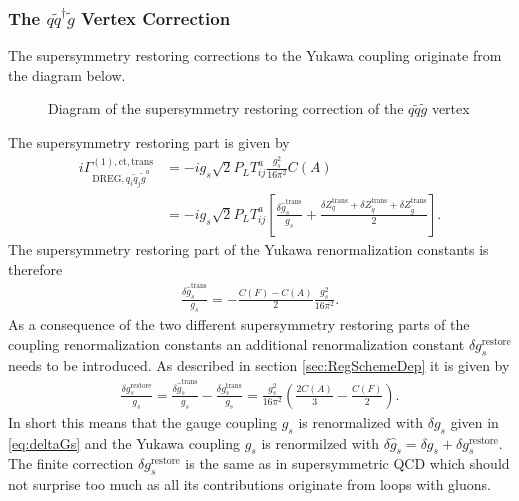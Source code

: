 \subsubsection*{The $q\tilde{q}^\dagger\tilde{g}$ Vertex Correction}
The supersymmetry restoring corrections to the Yukawa coupling originate from the diagram below.
\begin{figure}[!htbp]
\begin{center}
\caption{Diagram of the supersymmetry restoring correction of  the $q\tilde{q}\tilde{g}$ vertex}
\end{center}
\end{figure}
The supersymmetry restoring part is given by
\begin{align}
i\Gamma^{\mathrm{(1),ct,trans}}_{\mathrm{DREG}, q_i\tilde{q}_j\tilde{g}^a} &= -ig_s \sqrt{2} P_L T^a_{ij}  \frac{g_s^2}{16\pi^2}C(A)\\
&= -ig_s \sqrt{2} P_L T^a_{ij}  \left[ \frac{\delta \hat{g}_s^{\mathrm{trans}}}{g_s} + \frac{\delta Z^{\mathrm{trans}}_q + \delta Z^{\mathrm{trans}}_{\tilde{q}} + \delta Z^{\mathrm{trans}}_{\tilde{g}}}{2} \right].
\end{align}
The supersymmetry restoring part of the Yukawa renormalization constants is therefore
\begin{align}
\frac{\delta \hat{g}_s^{\mathrm{trans}}}{g_s} = -\frac{C(F)-C(A)}{2} \frac{g_s^2}{16\pi^2}.
\end{align}
As a consequence of the two different supersymmetry restoring parts of the coupling renormalization constants an additional renormalization constant $\delta g_s^{\mathrm{restore}}$ needs to be introduced. As described in section \ref{sec:RegSchemeDep} it is given by
\begin{align}
\frac{\delta g_s^{\mathrm{restore}}}{g_s} = \frac{\delta \hat{g}_s^{\mathrm{trans}}}{g_s} -\frac{\delta g_s^{\mathrm{trans}}}{g_s} = \frac{g_s^2}{16\pi^2}\left( \frac{2C(A)}{3} - \frac{C(F)}{2} \right).
\end{align}
In short this means that the gauge coupling $g_s$ is renormalized with $\delta g_s$ given in \ref{eq:deltaGs} and the Yukawa coupling $\hat{g}_s$ is renormilzed with $\delta \hat{g}_s = \delta g_s + \delta g_s^{\mathrm{restore}}$.\\
The finite correction $\delta g_s^{\mathrm{restore}}$ is the same as in supersymmetric QCD which should not surprise too much as all its contributions originate from loops with gluons.%


